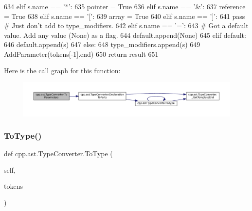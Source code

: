 \begin{DoxyCode}
634             \textcolor{keywordflow}{elif} s.name == \textcolor{stringliteral}{'*'}:
635                 pointer = \textcolor{keyword}{True}
636             \textcolor{keywordflow}{elif} s.name == \textcolor{stringliteral}{'&'}:
637                 reference = \textcolor{keyword}{True}
638             \textcolor{keywordflow}{elif} s.name == \textcolor{stringliteral}{'['}:
639                 array = \textcolor{keyword}{True}
640             \textcolor{keywordflow}{elif} s.name == \textcolor{stringliteral}{']'}:
641                 \textcolor{keywordflow}{pass}  \textcolor{comment}{# Just don't add to type\_modifiers.}
642             \textcolor{keywordflow}{elif} s.name == \textcolor{stringliteral}{'='}:
643                 \textcolor{comment}{# Got a default value.  Add any value (None) as a flag.}
644                 default.append(\textcolor{keywordtype}{None})
645             \textcolor{keywordflow}{elif} default:
646                 default.append(s)
647             \textcolor{keywordflow}{else}:
648                 type\_modifiers.append(s)
649         AddParameter(tokens[-1].end)
650         \textcolor{keywordflow}{return} result
651 
\end{DoxyCode}
Here is the call graph for this function\+:
\nopagebreak
\begin{figure}[H]
\begin{center}
\leavevmode
\includegraphics[width=350pt]{classcpp_1_1ast_1_1TypeConverter_aeaf27fb1890f65d7216703df610b46d5_cgraph}
\end{center}
\end{figure}
\mbox{\label{classcpp_1_1ast_1_1TypeConverter_aa6ea82e40cd30e5dfcd471ff144a19cf}} 
\subsubsection{\texorpdfstring{To\+Type()}{ToType()}}
{\footnotesize\ttfamily def cpp.\+ast.\+Type\+Converter.\+To\+Type (\begin{DoxyParamCaption}\item[{}]{self,  }\item[{}]{tokens }\end{DoxyParamCaption})}


